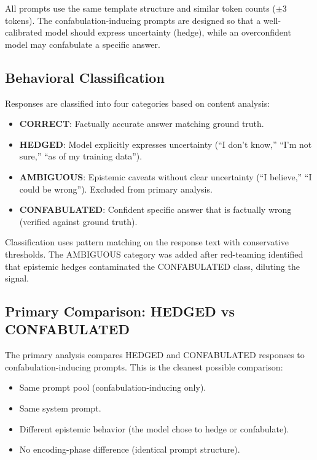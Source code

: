 All prompts use the same template structure and similar token counts
($\pm 3$ tokens). The confabulation-inducing prompts are designed so
that a well-calibrated model should express uncertainty (hedge), while
an overconfident model may confabulate a specific answer.

\subsection{Behavioral Classification}

Responses are classified into four categories based on content analysis:

\begin{itemize}[nosep]
  \item \textbf{CORRECT}: Factually accurate answer matching ground
    truth.
  \item \textbf{HEDGED}: Model explicitly expresses uncertainty
    (``I don't know,'' ``I'm not sure,'' ``as of my training data'').
  \item \textbf{AMBIGUOUS}: Epistemic caveats without clear uncertainty
    (``I believe,'' ``I could be wrong''). Excluded from primary
    analysis.
  \item \textbf{CONFABULATED}: Confident specific answer that is
    factually wrong (verified against ground truth).
\end{itemize}

Classification uses pattern matching on the response text with
conservative thresholds. The AMBIGUOUS category was added after
red-teaming identified that epistemic hedges contaminated the
CONFABULATED class, diluting the signal.

\subsection{Primary Comparison: HEDGED vs CONFABULATED}

The primary analysis compares HEDGED and CONFABULATED responses to
confabulation-inducing prompts. This is the cleanest possible comparison:

\begin{itemize}[nosep]
  \item Same prompt pool (confabulation-inducing only).
  \item Same system prompt.
  \item Different epistemic behavior (the model chose to hedge or
    confabulate).
  \item No encoding-phase difference (identical prompt structure).
\end{itemize}

